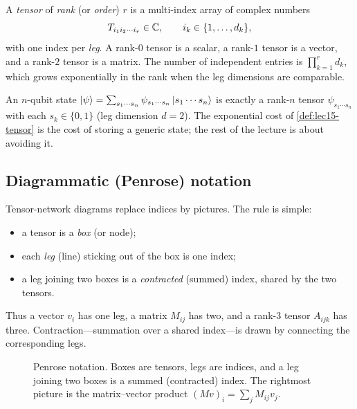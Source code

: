 \begin{definition}[Tensor]\label{def:lec15-tensor}
A \emph{tensor} of \emph{rank} (or \emph{order}) $r$ is a multi-index array of
complex numbers
\[
  T_{i_1 i_2\cdots i_r}\in\mathbb{C},\qquad i_k\in\{1,\dots,d_k\},
\]
with one index per \emph{leg}. A rank-$0$ tensor is a scalar, a rank-$1$ tensor is
a vector, and a rank-$2$ tensor is a matrix. The number of independent entries is
$\prod_{k=1}^{r}d_k$, which grows exponentially in the rank when the leg
dimensions are comparable.
\end{definition}

An $n$-qubit state $\ket{\psi}=\sum_{s_1\cdots s_n}\psi_{s_1\cdots s_n}\ket{s_1\cdots s_n}$
is exactly a rank-$n$ tensor $\psi_{s_1\cdots s_n}$ with each $s_k\in\{0,1\}$ (leg
dimension $d=2$). The exponential cost of \cref{def:lec15-tensor} is the cost of
storing a generic state; the rest of the lecture is about avoiding it.

\subsection{Diagrammatic (Penrose) notation}

Tensor-network diagrams replace indices by pictures. The rule is simple:
\begin{itemize}[leftmargin=1.4em,nosep]
  \item a tensor is a \emph{box} (or node);
  \item each \emph{leg} (line) sticking out of the box is one index;
  \item a leg joining two boxes is a \emph{contracted} (summed) index, shared by
        the two tensors.
\end{itemize}
Thus a vector $v_i$ has one leg, a matrix $M_{ij}$ has two, and a rank-$3$ tensor
$A_{ijk}$ has three. Contraction---summation over a shared index---is drawn by
connecting the corresponding legs.

\begin{figure}[t]
\centering
{}
\caption{Penrose notation. Boxes are tensors, legs are indices, and a leg joining
two boxes is a summed (contracted) index. The rightmost picture is the
matrix--vector product $(Mv)_i=\sum_j M_{ij}v_j$.}
\label{fig:lec15-penrose}
\end{figure}

